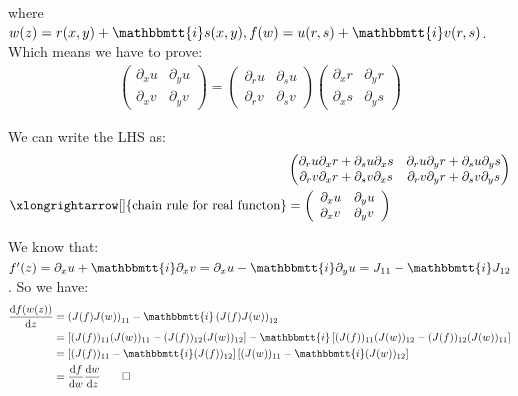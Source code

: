 \documentclass[]{ctexart}
\newcommand{\mi}{\mathbbmtt{i}}
\newcommand{\di}{\mathrm{d}}
\newcommand{\pa}{\partial}
\begin{document}
		where $w(z)=r(x,y)+\mi s(x,y), f(w)=u(r,s)+\mi v(r,s)$. Which means we have to prove:
			\begin{equation*}
			\begin{aligned}
				\left(\begin{array}{ll}
				\partial_{x} u & \partial_{y} u \\
				\partial_{x} v & \partial_{y} v
				\end{array}\right)=\left(\begin{array}{ll}
				\partial_{r} u & \partial_{s} u \\
				\partial_{r} v & \partial_{s} v
				\end{array}\right)\left(\begin{array}{ll}
				\partial_{x} r & \partial_{y} r \\
				\partial_{x} s & \partial_{y} s
				\end{array}\right)
			\end{aligned}
			\end{equation*}
		
		We can write the LHS as:
			\begin{equation*}
			\begin{aligned}
				&\begin{pmatrix}
					\pa_ru\pa_xr+\pa_su\pa_xs & \pa_ru\pa_yr+\pa_su\pa_ys\\
					\pa_rv\pa_xr+\pa_sv\pa_xs & \pa_rv\pa_yr+\pa_sv\pa_ys
				\end{pmatrix}\\
				\xlongrightarrow[]{\text{chain rule for real functon}}&=
				\left(\begin{array}{ll}
				\partial_{x} u & \partial_{y} u \\
				\partial_{x} v & \partial_{y} v
				\end{array}\right)
			\end{aligned}
			\end{equation*}
		
		We know that: $f'(z)=\pa_xu+\mi \pa_xv=\pa_xu-\mi \pa_yu=J_{11}-\mi J_{12}$. So we have:
			\begin{equation*}
			\begin{aligned}
				\frac{\di f(w(z))}{\di z}&=\left(J(f)J(w)\right)_{11}-\mi \left(J(f)J(w)\right)_{12}\\
				&=\left[(J(f))_{11}(J(w))_{11}-(J(f))_{12}(J(w))_{12}\right]-\mi \left[(J(f))_{11}(J(w))_{12}-(J(f))_{12}(J(w))_{11}\right]\\
				&=\left[(J(f))_{11}-\mi (J(f))_{12} \right]\left[(J(w))_{11}-\mi (J(w))_{12}\right]\\
				&=\frac{\di f}{\di w}\frac{\di w}{\di z}\qquad \Box
			\end{aligned}
			\end{equation*}
\end{document}
